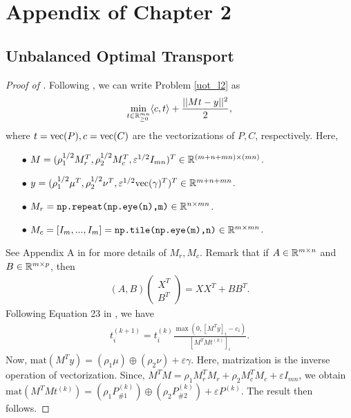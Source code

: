 \section{Appendix of Chapter 2}

\subsection{Unbalanced Optimal Transport}

\begin{proof}[Proof of ]
Following \citep{Chapel21}, we can write Problem \eqref{uot_l2} as
\begin{align}
    \min_{t \in \mathbb R^{mn}_{\geq 0}} \langle c, t \rangle + \frac{|| Mt - y ||^2}{2},
\end{align}
where $t = \text{vec}(P), c = \text{vec}(C)$ are the vectorizations of $P, C$, respectively. Here,
\begin{itemize}
    \item[$\bullet$] $M = (\rho_1^{1/2} M_r^T, \rho_2^{1/2} M_c^T, \varepsilon^{1/2} I_{mn})^T \in \mathbb R^{(m + n + mn) \times (mn)}$.

    \item[$\bullet$] $y = (\rho_1^{1/2} \mu^T, \rho_2^{1/2} \nu^T, \varepsilon^{1/2} \text{vec}(\gamma)^T)^T \in \mathbb R^{m + n + mn}$.

    \item[$\bullet$] $M_r = \texttt{np.repeat(np.eye(n),m)} \in \mathbb R^{n \times mn}$.

    \item[$\bullet$] $M_c = [I_m, ..., I_m] = \texttt{np.tile(np.eye(m),n)} \in \mathbb R^{m \times mn}$.
\end{itemize}
See Appendix A in \citep{Chapel21} for more details of $M_r, M_c$.
Remark that if $A \in \mathbb R^{m \times n}$ and $B \in \mathbb R^{m \times p}$, then
\begin{align}
    (A, B) \begin{pmatrix}
        X^T \\
        B^T
    \end{pmatrix}
    = X X^T + B B^T.
\end{align}
Following Equation 23 in \citep{Chapel21},  we have
\begin{align}
    t^{(k+1)}_i = t^{(k)}_i \frac{\max( 0, [M^T y]_i - c_i)}{[M^T M t^{(k)}]_i}.
\end{align}
Now, $\text{mat}(M^T y) = (\rho_1 \mu) \oplus (\rho_2 \nu) + \varepsilon \gamma$.
Here, matrization is the inverse operation of vectorization. Since,
$M^T M = \rho_1 M_r^T M_r + \rho_2 M_c^T M_c + \varepsilon I_{mn}$, we obtain
$\text{mat}(M^T M t^{(k)}) = (\rho_1 P_{\# 1}^{(k)}) \oplus (\rho_2 P_{\# 2}^{(k)})
+ \varepsilon P^{(k)} $. The result then follows.
\end{proof}

